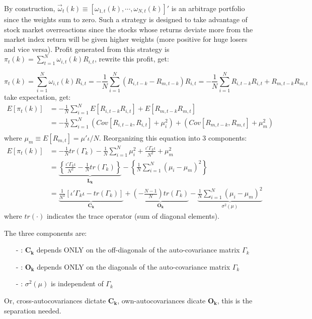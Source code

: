 By construction, $\vec{\omega}_{t}(k)\equiv \left[\omega_{1,t}(k),\cdots,\omega_{N,t}(k)\right]'$ is an arbitrage portfolio 
since the weights sum to zero. Such a strategy is designed to take advantage of stock market overreactions since the stocks
whose returns deviate more from the market index return will be given higher weights (more positive for huge losers and 
vice versa). Profit generated from this strategy is $\pi_t(k)=\sum^N_{t=1}\omega_{i,t}(k)R_{i,t}$, rewrite this profit, get:

$$
\pi_t(k)= \sum^N_{i=1}\omega_{i,t}(k)R_{i,t}= -\frac{1}{N}\sum^N_{i=1}\left(R_{i,t-k}-R_{m,t-k}\right)R_{i,t} = -\frac{1}{N}\sum^N_{i=1}R_{i,t-k}R_{i,t}+R_{m,t-k}R_{m,t}
$$
take expectation, get:
\begin{align*}
    E[\pi_t(k)] &= -\frac{1}{N}\sum^N_{i=1} E\left[R_{i,t-k}R_{i,t}\right]+E\left[R_{m,t-k}R_{m,t}\right]\\
    &= -\frac{1}{N}\sum^N_{i=1}\left(Cov\left[R_{i,t-k},R_{i,t}\right] +\mu_i^2 \right) + \left(Cov\left[R_{m,t-k},R_{m,t}\right] +\mu_m^2 \right)\\
\end{align*}
where $\mu_m\equiv E\left[R_{m,t}\right]=\mu'\iota/N$. Reorganizing this equation into 3 components:
\begin{align}
    E[\pi_t(k)] &= -\frac{1}{N}tr(\Gamma_k) -\frac{1}{N}\sum^N_{i=1}\mu_i^2+\frac{\iota'\Gamma_k\iota}{N^2}+\mu_m^2 \nonumber \\
    & = \underbrace{\left\{\frac{\iota'\Gamma_k\iota}{N^2} -\frac{1}{N} tr(\Gamma_k) \right\}}_{\mathbf{L_k}}- \left\{\frac{1}{N}\sum^N_{i=1}(\mu_i-\mu_m)^2\right\} \nonumber \\
    & = \underbrace{\frac{1}{N^2}\left[\iota'\Gamma_k\iota-tr(\Gamma_k)\right]}_{\mathbf{C_k}} + \underbrace{\left(-\frac{N-1}{N}\right)tr(\Gamma_k)}_{\mathbf{O_k}} - \underbrace{\frac{1}{N}\sum^N_{i=1}(\mu_i-\mu_m)^2}_{\sigma^2(\mu)} \label{eq1.7}
\end{align}
where $tr(\cdot)$ indicates the trace operator (sum of diagonal elements).

The three components are:
\begin{enumerate}
    \item[-]: $\mathbf{C_k}$ depends ONLY on the off-diagonals of the auto-covariance matrix $\Gamma_k$
    \item[-]: $\mathbf{O_k}$ depends ONLY on the diagonals of the auto-covariance matrix $\Gamma_k$
    \item[-]: $\sigma^2(\mu)$ is independent of $\Gamma_k$
\end{enumerate}
Or, cross-autocovariances dictate $\mathbf{C_k}$, own-autocovariances dicate $\mathbf{O_k}$, this is the separation needed.

